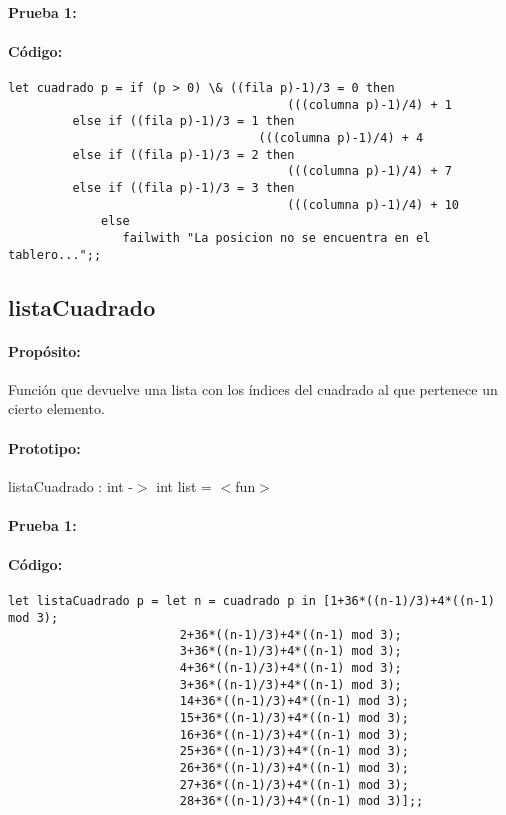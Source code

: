 \paragraph{Prueba 1:}
\paragraph{Código:}
\begin{verbatim}
let cuadrado p = if (p > 0) \& ((fila p)-1)/3 = 0 then 
		                               (((columna p)-1)/4) + 1 
  		 else if ((fila p)-1)/3 = 1 then 
			                       (((columna p)-1)/4) + 4 
  		 else if ((fila p)-1)/3 = 2 then 
		                               (((columna p)-1)/4) + 7
  		 else if ((fila p)-1)/3 = 3 then 
		                               (((columna p)-1)/4) + 10  
  	         else
	            failwith "La posicion no se encuentra en el tablero...";;
\end{verbatim}

\subsection{listaCuadrado}

\paragraph{Propósito:} Función que devuelve una lista con los índices del cuadrado al que
pertenece un cierto elemento.
\paragraph{Prototipo:} listaCuadrado : int -$>$ int list = $<$fun$>$
\paragraph{Prueba 1:}
\paragraph{Código:}
\begin{verbatim}
let listaCuadrado p = let n = cuadrado p in [1+36*((n-1)/3)+4*((n-1) mod 3);
					    2+36*((n-1)/3)+4*((n-1) mod 3);
					    3+36*((n-1)/3)+4*((n-1) mod 3);
					    4+36*((n-1)/3)+4*((n-1) mod 3);
					    3+36*((n-1)/3)+4*((n-1) mod 3);
					    14+36*((n-1)/3)+4*((n-1) mod 3);
					    15+36*((n-1)/3)+4*((n-1) mod 3);
					    16+36*((n-1)/3)+4*((n-1) mod 3);
					    25+36*((n-1)/3)+4*((n-1) mod 3);
					    26+36*((n-1)/3)+4*((n-1) mod 3);
					    27+36*((n-1)/3)+4*((n-1) mod 3);
					    28+36*((n-1)/3)+4*((n-1) mod 3)];;
\end{verbatim}

